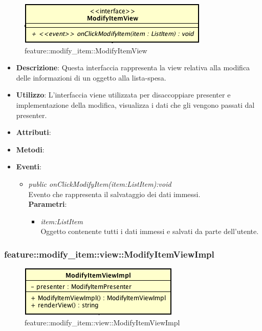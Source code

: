\label{feature::modify_item::ModifyItemView}
\begin{figure}[H]
	\centering
	\includegraphics[scale=0.5]{Sezioni/SottosezioniST/img/app/ModifyItemView.png}
	\caption{feature::modify\_item::ModifyItemView}
\end{figure}

\begin{itemize}
\item \textbf{Descrizione}: Questa interfaccia rappresenta la view relativa alla modifica delle informazioni di un oggetto alla lista-spesa.
\item \textbf{Utilizzo}: L'interfaccia viene utilizzata per disaccoppiare presenter e implementazione della modifica, visualizza i dati che gli vengono passati dal presenter.
\item \textbf{Attributi}: 
\item \textbf{Metodi}:
\item \textbf{Eventi}:
	\begin{itemize}
	\item \textit{public onClickModifyItem(item:ListItem):void}\\
	Evento che rappresenta il salvataggio dei dati immessi.
			\\ \textbf{Parametri}: \begin{itemize}
			\item \textit{item:ListItem}\\
			Oggetto contenente tutti i dati immessi e salvati da parte dell'utente.
			\end{itemize} 
	\end{itemize}
\end{itemize}

\subsubsection{feature::modify\_item::view::ModifyItemViewImpl}

\label{feature::modify_item::view::ModifyItemViewImpl}
\begin{figure}[H]
	\centering
	\includegraphics[scale=0.5]{Sezioni/SottosezioniST/img/app/ModifyItemViewImpl.png}
	\caption{feature::modify\_item::view::ModifyItemViewImpl}
\end{figure}

